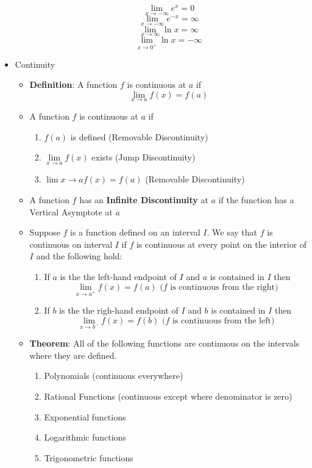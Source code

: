 \documentclass{article}
\begin{document}
\begin{itemize}
\begin{itemize}
		$$\lim_{x \to - \infty}{e^x} = 0$$
		$$\lim_{x \to - \infty}{e^{-x}} = \infty$$
		$$\lim_{x \to \infty}{\ln{x}} = \infty$$
		$$\lim_{x \to 0^+}{\ln{x}} = - \infty$$
	\end{itemize}
	\item Continuity \\
	\begin{itemize}
		\item \textbf{Definition}: A function $f$ is continuous at $a$ if
		$$\lim_{x \to a}{f(x)} = f(a)$$
		\item A function $f$ is continuous at $a$ if
		\begin{enumerate}
			\item $f(a)$ is defined (Removable Discontinuity)
			\item $\lim\limits_{x \to a}{f(x)}$ exists (Jump Discontinuity)
			\item $\lim\limits{x \to a}{f(x)} = f(a)$ (Removable Discontinuity)
		\end{enumerate}
		\item A function $f$ has an \textbf{Infinite Discontinuity} at $a$ if the function has a Vertical Asymptote at $a$ \\
		\item Suppose $f$ is a function defined on an interval $I$. We say that $f$ is continuous on interval $I$ if $f$ is continuous at every point on the interior of $I$ and the following hold: \\
		\begin{enumerate}
			\item If $a$ is the the left-hand endpoint of $I$ and $a$ is contained in $I$ then
			$$\lim_{x \to a^+}{f(x)} = f(a) \text{ ($f$ is continuous from the right)}$$
			\item If $b$ is the the righ-hand endpoint of $I$ and $b$ is contained in $I$ then
			$$\lim_{x \to b^-}{f(x)} = f(b) \text{ ($f$ is continuous from the left)}$$
		\end{enumerate}
		\item \textbf{Theorem}: All of the following functions are continuous on the intervals where they are defined.
		\begin{enumerate}
			\item Polynomials (continuous everywhere)
			\item Rational Functions (continuous except where denominator is zero)
			\item Exponential functions
			\item Logarithmic functions
			\item Trigonometric functions

\end{enumerate}
\end{itemize}
\end{itemize}
\end{document}

